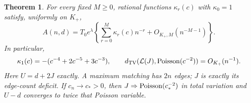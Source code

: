 \documentclass[11pt,letterpaper]{article}
\newtheorem{theorem}{Theorem}[section]
\theoremstyle{remark}\newtheorem{remark}[theorem]{Remark}
\begin{document}
\begin{theorem}\label{tmm:bd:thm:exterior}
For every fixed $M\ge0$, rational functions $\kappa_r(c)$ with $\kappa_0=1$ satisfy, uniformly on $K_+$,
\begin{equation}\label{tmm:bd:eq:exteriorall}
 A(n,d)=T_0e^\lambda\left\{\sum_{r=0}^M\kappa_r(c)n^{-r}
                                    +O_{K_+,M}(n^{-M-1})\right\}.
\end{equation}
In particular,
\begin{equation}\label{tmm:bd:eq:exteriorfirst}
 \kappa_1(c)=-(c^{-4}+2c^{-5}+3c^{-3}),\qquad
 d_{\mathrm{TV}}(\mathcal L(J),\operatorname{Poisson}(c^{-2}))=O_{K_+}(n^{-1}).
\end{equation}
Here $U=d+2J$ exactly. A maximum matching has $2n$ edges; $J$ is exactly its edge-count deficit. If $c_n\to c_*>0$, then $J\Rightarrow\operatorname{Poisson}(c_*^{-2})$ in total variation and $U-d$ converges to twice that Poisson variable.
\end{theorem}
\end{document}
